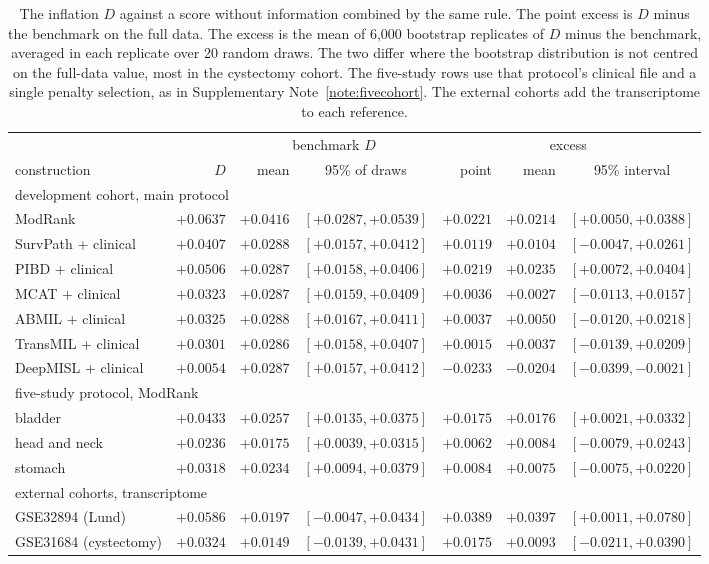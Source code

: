 \documentclass[11pt]{article}
\begin{document}
\begin{table}[h]
\centering
{\small
\setlength{\tabcolsep}{3.5pt}
\begin{tabular}{lrrcrrc}
\toprule
 & & \multicolumn{2}{c}{benchmark $D$} & \multicolumn{3}{c}{excess} \\
\cmidrule(lr){3-4}\cmidrule(lr){5-7}
construction & $D$ & mean & 95\% of draws & point & mean & 95\% interval \\
\midrule
\multicolumn{7}{l}{development cohort, main protocol} \\
ModRank & $+0.0637$ & $+0.0416$ & $[+0.0287, +0.0539]$ & $+0.0221$ & $+0.0214$ & $[+0.0050, +0.0388]$ \\
SurvPath + clinical & $+0.0407$ & $+0.0288$ & $[+0.0157, +0.0412]$ & $+0.0119$ & $+0.0104$ & $[-0.0047, +0.0261]$ \\
PIBD + clinical & $+0.0506$ & $+0.0287$ & $[+0.0158, +0.0406]$ & $+0.0219$ & $+0.0235$ & $[+0.0072, +0.0404]$ \\
MCAT + clinical & $+0.0323$ & $+0.0287$ & $[+0.0159, +0.0409]$ & $+0.0036$ & $+0.0027$ & $[-0.0113, +0.0157]$ \\
ABMIL + clinical & $+0.0325$ & $+0.0288$ & $[+0.0167, +0.0411]$ & $+0.0037$ & $+0.0050$ & $[-0.0120, +0.0218]$ \\
TransMIL + clinical & $+0.0301$ & $+0.0286$ & $[+0.0158, +0.0407]$ & $+0.0015$ & $+0.0037$ & $[-0.0139, +0.0209]$ \\
DeepMISL + clinical & $+0.0054$ & $+0.0287$ & $[+0.0157, +0.0412]$ & $-0.0233$ & $-0.0204$ & $[-0.0399, -0.0021]$ \\
\midrule
\multicolumn{7}{l}{five-study protocol, ModRank} \\
bladder & $+0.0433$ & $+0.0257$ & $[+0.0135, +0.0375]$ & $+0.0175$ & $+0.0176$ & $[+0.0021, +0.0332]$ \\
head and neck & $+0.0236$ & $+0.0175$ & $[+0.0039, +0.0315]$ & $+0.0062$ & $+0.0084$ & $[-0.0079, +0.0243]$ \\
stomach & $+0.0318$ & $+0.0234$ & $[+0.0094, +0.0379]$ & $+0.0084$ & $+0.0075$ & $[-0.0075, +0.0220]$ \\
\midrule
\multicolumn{7}{l}{external cohorts, transcriptome} \\
GSE32894 (Lund) & $+0.0586$ & $+0.0197$ & $[-0.0047, +0.0434]$ & $+0.0389$ & $+0.0397$ & $[+0.0011, +0.0780]$ \\
GSE31684 (cystectomy) & $+0.0324$ & $+0.0149$ & $[-0.0139, +0.0431]$ & $+0.0175$ & $+0.0093$ & $[-0.0211, +0.0390]$ \\
\bottomrule
\end{tabular}}
\caption{The inflation $D$ against a score without information combined by the same rule. The point
excess is $D$ minus the benchmark on the full data. The excess is the mean of 6,000 bootstrap
replicates of $D$ minus the benchmark, averaged in each replicate over 20 random draws. The two differ
where the bootstrap distribution is not centred on the full-data value, most in the cystectomy
cohort. The five-study rows use that protocol's
clinical file and a single penalty selection, as in Supplementary Note~\ref{note:fivecohort}. The
external cohorts add the transcriptome to each reference.}
\label{tab:nulld}
\end{table}
\end{document}
